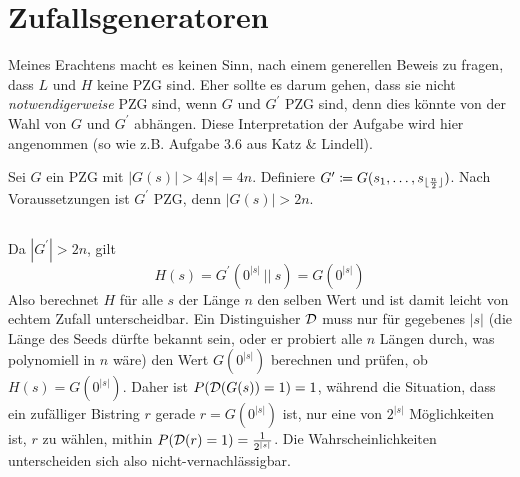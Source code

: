 \documentclass{../crypto}
\date{27. November 2015}
\begin{document}
\maketitle

\section{Zufallsgeneratoren}

Meines Erachtens macht es keinen Sinn, nach einem generellen Beweis zu fragen,
dass $L$ und $H$ keine PZG sind. Eher sollte es darum gehen, dass sie nicht
\emph{notwendigerweise} PZG sind, wenn $G$ und $G^\prime$ PZG sind, denn dies
könnte von der Wahl von $G$ und $G^\prime$ abhängen. Diese
Interpretation der Aufgabe wird hier angenommen (so wie z.B. Aufgabe 3.6 aus
Katz \& Lindell).

Sei $G$ ein PZG mit $|G(s)| > 4|s| = 4n$. Definiere $G^\prime \coloneqq
G(s_1,\ldots,s_{\lfloor \frac{n}{2} \rfloor})$.  Nach Voraussetzungen ist
$G^\prime$ PZG, denn $|G(s)| > 2n$. 

\subsection{}

Da $|G^\prime| > 2n$, gilt 
\begin{equation*}
   H(s) = G^\prime(0^{|s|} ~||~ s) = G(0^{|s|})
\end{equation*}
Also berechnet $H$ für alle $s$ der Länge $n$ den selben Wert und ist damit leicht von echtem
Zufall unterscheidbar. Ein Distinguisher $\mathcal{D}$ muss nur für gegebenes $|s|$
(die Länge des Seeds dürfte bekannt sein, oder er probiert alle $n$ Längen
durch, was polynomiell in $n$ wäre)
den Wert $G(0^{|s|})$ berechnen und prüfen, ob $H(s) = G(0^{|s|})$. Daher ist
$P(\mathcal{D}(G(s)) = 1) = 1$, während die Situation, dass ein zufälliger
Bistring $r$ gerade $r=G(0^{|s|})$ ist, nur eine von $2^{|s|}$ Möglichkeiten
ist, $r$ zu wählen, mithin $P(\mathcal{D}(r) = 1) = \frac{1}{2^{|s|}}$. Die
Wahrscheinlichkeiten unterscheiden sich also nicht-vernachlässigbar.

\subsection{}

\end{document}
